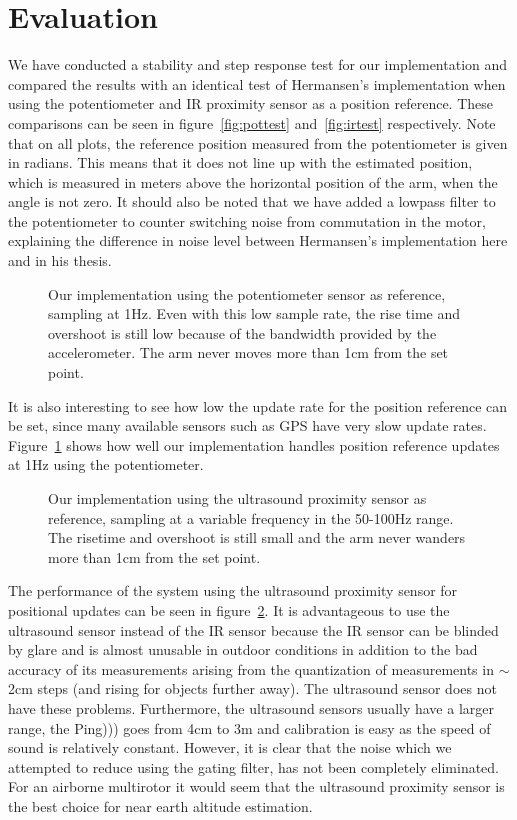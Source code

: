 \section{Evaluation}\label{sec:evaluation}
We have conducted a stability and step response test for our implementation and compared the results with an identical test of
Hermansen's implementation when using the potentiometer and IR proximity sensor as a position reference. These comparisons can be
seen in figure~\ref{fig:pottest} and~\ref{fig:irtest} respectively. Note that on all plots, the reference position measured from the
potentiometer is given in radians. This means that it does not line up with the estimated position, which is measured in meters above
the horizontal position of the arm, when the angle is not zero. It should also be noted that we have added a lowpass filter to the
potentiometer to counter switching noise from commutation in the motor,
explaining the difference in noise level between Hermansen's implementation here and in his thesis.
\begin{figure}
	\setlength\figureheight{4cm}
	\setlength\figurewidth{6cm}
	
	\caption{Our implementation using the potentiometer sensor as reference, sampling at 1Hz. Even with this low sample rate, the
		rise time and overshoot is still low because of the bandwidth provided by the accelerometer. The arm never moves more than
		1cm from the set point.}
\label{fig:pot1hztest}
\end{figure}

It is also interesting to see how low the update rate for the position reference can be set, since many available sensors such as GPS 
have very slow update rates. Figure~\ref{fig:pot1hztest} shows how well our implementation handles position reference updates at
1Hz using the potentiometer.
\begin{figure}
	\setlength\figureheight{4cm}
	\setlength\figurewidth{6cm}
	
	\caption{Our implementation using the ultrasound proximity sensor as reference, sampling at a variable frequency in the 50-100Hz 
	range. The risetime and overshoot is still small and the arm never wanders more than 1cm from the set point.}
\label{fig:ultratest}
\end{figure}


The performance of the system using the ultrasound proximity sensor for positional updates can be seen in figure~\ref{fig:ultratest}.
It is advantageous to use the ultrasound sensor instead of the IR sensor because the IR sensor can be blinded by glare and is almost
unusable in outdoor conditions in addition to the bad accuracy of its measurements arising from the quantization of measurements in
\(\sim\)2cm steps (and rising for objects further away). The ultrasound sensor
does not have these problems. Furthermore, the ultrasound sensors usually have a
larger range, the Ping))) goes from 4cm to 3m and calibration is easy as the
speed of sound is relatively constant. However, it is clear that the noise
which we attempted to reduce using the gating filter, has not been completely eliminated.
For an airborne multirotor it would seem that the ultrasound proximity sensor is the best choice for near earth altitude estimation.